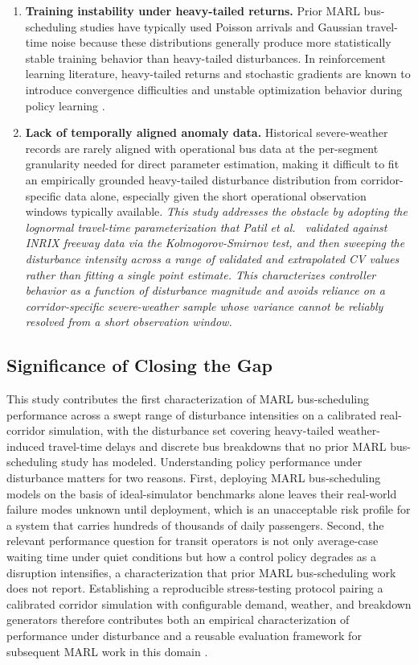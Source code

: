 \begin{enumerate}
\item \textbf{Training instability under heavy-tailed returns.} Prior MARL bus-scheduling studies have typically used Poisson arrivals and Gaussian travel-time noise because these distributions generally produce more statistically stable training behavior than heavy-tailed disturbances. In reinforcement learning literature, heavy-tailed returns and stochastic gradients are known to introduce convergence difficulties and unstable optimization behavior during policy learning \cite{Henderson2018Matters,Agarwal2021Precipice}.

\item \textbf{Lack of temporally aligned anomaly data.} Historical severe-weather records are rarely aligned with operational bus data at the per-segment granularity needed for direct parameter estimation, making it difficult to fit an empirically grounded heavy-tailed disturbance distribution from corridor-specific data alone, especially given the short operational observation windows typically available. \textit{This study addresses the obstacle by adopting the lognormal travel-time parameterization that Patil et al.\ \cite{Patil2025Conformal} validated against INRIX freeway data via the Kolmogorov-Smirnov test, and then sweeping the disturbance intensity across a range of validated and extrapolated CV values rather than fitting a single point estimate. This characterizes controller behavior as a function of disturbance magnitude and avoids reliance on a corridor-specific severe-weather sample whose variance cannot be reliably resolved from a short observation window.}
\end{enumerate}

\subsection{Significance of Closing the Gap}
This study contributes the first characterization of MARL bus-scheduling performance across a swept range of disturbance intensities on a calibrated real-corridor simulation, with the disturbance set covering heavy-tailed weather-induced travel-time delays and discrete bus breakdowns that no prior MARL bus-scheduling study has modeled. Understanding policy performance under disturbance matters for two reasons. First, deploying MARL bus-scheduling models on the basis of ideal-simulator benchmarks alone leaves their real-world failure modes unknown until deployment, which is an unacceptable risk profile for a system that carries hundreds of thousands of daily passengers. Second, the relevant performance question for transit operators is not only average-case waiting time under quiet conditions but how a control policy degrades as a disruption intensifies, a characterization that prior MARL bus-scheduling work does not report. Establishing a reproducible stress-testing protocol pairing a calibrated corridor simulation with configurable demand, weather, and breakdown generators therefore contributes both an empirical characterization of performance under disturbance and a reusable evaluation framework for subsequent MARL work in this domain \cite{Li2023Departure,Wang2024MultiAGV,Che2024Recharging,Huang2025Joint,Bokade2023MARL}.